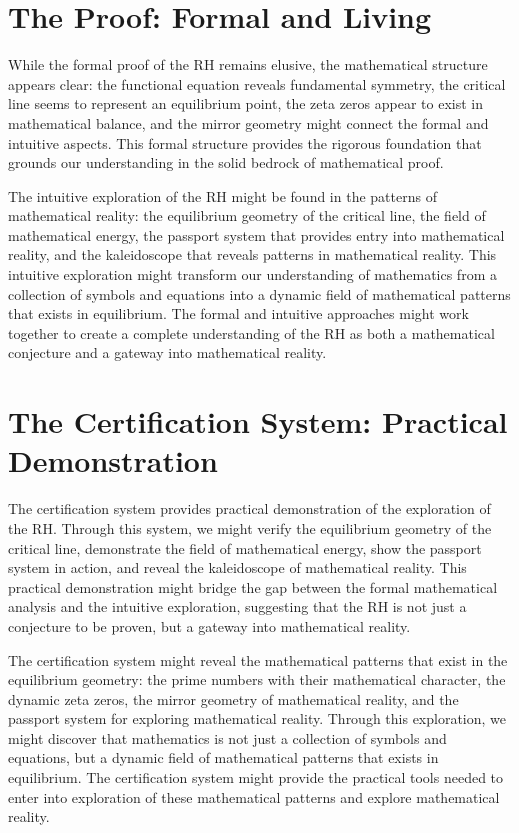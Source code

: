 \documentclass{article}
\begin{document}
\section{The Proof: Formal and Living}

While the formal proof of the RH remains elusive, the mathematical structure appears clear: the functional equation reveals fundamental symmetry, the critical line seems to represent an equilibrium point, the zeta zeros appear to exist in mathematical balance, and the mirror geometry might connect the formal and intuitive aspects. This formal structure provides the rigorous foundation that grounds our understanding in the solid bedrock of mathematical proof.

The intuitive exploration of the RH might be found in the patterns of mathematical reality: the equilibrium geometry of the critical line, the field of mathematical energy, the passport system that provides entry into mathematical reality, and the kaleidoscope that reveals patterns in mathematical reality. This intuitive exploration might transform our understanding of mathematics from a collection of symbols and equations into a dynamic field of mathematical patterns that exists in equilibrium. The formal and intuitive approaches might work together to create a complete understanding of the RH as both a mathematical conjecture and a gateway into mathematical reality.

\section{The Certification System: Practical Demonstration}

The certification system provides practical demonstration of the exploration of the RH. Through this system, we might verify the equilibrium geometry of the critical line, demonstrate the field of mathematical energy, show the passport system in action, and reveal the kaleidoscope of mathematical reality. This practical demonstration might bridge the gap between the formal mathematical analysis and the intuitive exploration, suggesting that the RH is not just a conjecture to be proven, but a gateway into mathematical reality.

The certification system might reveal the mathematical patterns that exist in the equilibrium geometry: the prime numbers with their mathematical character, the dynamic zeta zeros, the mirror geometry of mathematical reality, and the passport system for exploring mathematical reality. Through this exploration, we might discover that mathematics is not just a collection of symbols and equations, but a dynamic field of mathematical patterns that exists in equilibrium. The certification system might provide the practical tools needed to enter into exploration of these mathematical patterns and explore mathematical reality.
\end{document}
